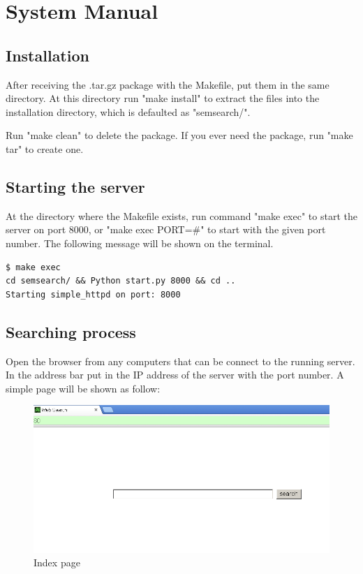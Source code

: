 \documentclass[12pt]{cls}
\begin{document}
\chapter{System Manual}

\section{Installation}

After receiving the .tar.gz package with the Makefile, put them in the same directory. At this directory run "make install" to extract the files into the installation directory, which is defaulted as "semsearch/".

Run "make clean" to delete the package. If you ever need the package, run "make tar" to create one.

\section{Starting the server}

At the directory where the Makefile exists, run command "make exec" to start the server on port 8000, or "make exec PORT=\#" to start with the given port number. The following message will be shown on the terminal.

\begin{verbatim}
$ make exec
cd semsearch/ && Python start.py 8000 && cd ..
Starting simple_httpd on port: 8000
\end{verbatim}

\section{Searching process}

Open the browser from any computers that can be connect to the running server. In the address bar put in the IP address of the server with the port number. A simple page will be shown as follow:

\begin{figure}[H]
\centering
\includegraphics[width=\textwidth]{figures/page1.png}
\caption{Index page}
\label{Index page}
\end{figure}
\end{document}
